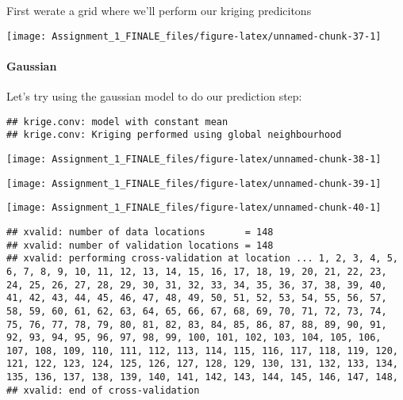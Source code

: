 \documentclass[
]{article}
\begin{document}
First werate a grid where we'll perform our kriging predicitons

\begin{center}\texttt{[image: Assignment\_1\_FINALE\_files/figure-latex/unnamed-chunk-37-1]} \end{center}

\hypertarget{gaussian-1}{%
\paragraph{Gaussian}\label{gaussian-1}}

Let's try using the gaussian model to do our prediction step:

\begin{verbatim}
## krige.conv: model with constant mean
## krige.conv: Kriging performed using global neighbourhood
\end{verbatim}

\begin{center}\texttt{[image: Assignment\_1\_FINALE\_files/figure-latex/unnamed-chunk-38-1]} \end{center}

\begin{center}\texttt{[image: Assignment\_1\_FINALE\_files/figure-latex/unnamed-chunk-39-1]} \end{center}

\begin{center}\texttt{[image: Assignment\_1\_FINALE\_files/figure-latex/unnamed-chunk-40-1]} \end{center}

\begin{verbatim}
## xvalid: number of data locations       = 148
## xvalid: number of validation locations = 148
## xvalid: performing cross-validation at location ... 1, 2, 3, 4, 5, 6, 7, 8, 9, 10, 11, 12, 13, 14, 15, 16, 17, 18, 19, 20, 21, 22, 23, 24, 25, 26, 27, 28, 29, 30, 31, 32, 33, 34, 35, 36, 37, 38, 39, 40, 41, 42, 43, 44, 45, 46, 47, 48, 49, 50, 51, 52, 53, 54, 55, 56, 57, 58, 59, 60, 61, 62, 63, 64, 65, 66, 67, 68, 69, 70, 71, 72, 73, 74, 75, 76, 77, 78, 79, 80, 81, 82, 83, 84, 85, 86, 87, 88, 89, 90, 91, 92, 93, 94, 95, 96, 97, 98, 99, 100, 101, 102, 103, 104, 105, 106, 107, 108, 109, 110, 111, 112, 113, 114, 115, 116, 117, 118, 119, 120, 121, 122, 123, 124, 125, 126, 127, 128, 129, 130, 131, 132, 133, 134, 135, 136, 137, 138, 139, 140, 141, 142, 143, 144, 145, 146, 147, 148, 
## xvalid: end of cross-validation
\end{verbatim}
\end{document}
